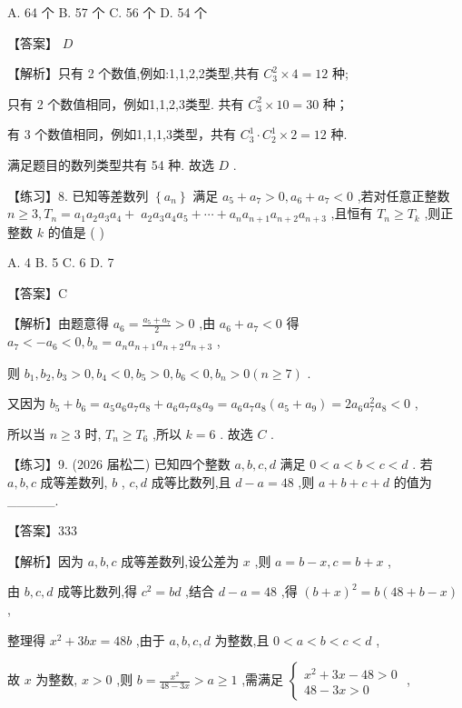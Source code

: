 \documentclass[10pt]{article}
\begin{document}
A. 64 个 B. 57 个 C. 56 个 D. 54 个

【答案】 \(D\)

【解析】只有 2 个数值,例如:1,1,2,2类型,共有 \({C}_{3}^{2} \times  4 = {12}\) 种;

只有 2 个数值相同，例如1,1,2,3类型. 共有 \({C}_{3}^{2} \times  {10} = {30}\) 种；

有 3 个数值相同，例如1,1,1,3类型，共有 \({C}_{3}^{1} \cdot  {C}_{2}^{1} \times  2 = {12}\) 种.

满足题目的数列类型共有 54 种. 故选 \(D\) .

【练习】8. 已知等差数列 \(\left\{  {a}_{n}\right\}\) 满足 \({a}_{5} + {a}_{7} > 0,{a}_{6} + {a}_{7} < 0\) ,若对任意正整数 \(n \geq  3,{T}_{n} = {a}_{1}{a}_{2}{a}_{3}{a}_{4} + \; {a}_{2}{a}_{3}{a}_{4}{a}_{5} + \cdots  + {a}_{n}{a}_{n + 1}{a}_{n + 2}{a}_{n + 3}\) ,且恒有 \({T}_{n} \geq  {T}_{k}\) ,则正整数 \(k\) 的值是 ( )

A. 4 B. 5 C. 6 D. 7

【答案】C

【解析】由题意得 \({a}_{6} = \frac{{a}_{5} + {a}_{7}}{2} > 0\) ,由 \({a}_{6} + {a}_{7} < 0\) 得 \({a}_{7} <  - {a}_{6} < 0,{b}_{n} = {a}_{n}{a}_{n + 1}{a}_{n + 2}{a}_{n + 3}\) ,

则 \({b}_{1},{b}_{2},{b}_{3} > 0,{b}_{4} < 0,{b}_{5} > 0,{b}_{6} < 0,{b}_{n} > 0\left( {n \geq  7}\right)\) .

又因为 \({b}_{5} + {b}_{6} = {a}_{5}{a}_{6}{a}_{7}{a}_{8} + {a}_{6}{a}_{7}{a}_{8}{a}_{9} = {a}_{6}{a}_{7}{a}_{8}\left( {{a}_{5} + {a}_{9}}\right)  = 2{a}_{6}{a}_{7}^{2}{a}_{8} < 0\) ,

所以当 \(n \geq  3\) 时, \({T}_{n} \geq  {T}_{6}\) ,所以 \(k = 6\) . 故选 \(C\) .

【练习】9. (2026 届松二) 已知四个整数 \(a,b,c,d\) 满足 \(0 < a < b < c < d\) . 若 \(a,b,c\) 成等差数列, \(b\) , \(c,d\) 成等比数列,且 \(d - a = {48}\) ,则 \(a + b + c + d\) 的值为\_\_\_\_\_.

【答案】333

【解析】因为 \(a,b,c\) 成等差数列,设公差为 \(x\) ,则 \(a = b - x,c = b + x\) ,

由 \(b,c,d\) 成等比数列,得 \({c}^{2} = {bd}\) ,结合 \(d - a = {48}\) ,得 \({\left( b + x\right) }^{2} = b\left( {{48} + b - x}\right)\) ,

整理得 \({x}^{2} + {3bx} = {48b}\) ,由于 \(a,b,c,d\) 为整数,且 \(0 < a < b < c < d\) ,

故 \(x\) 为整数, \(x > 0\) ,则 \(b = \frac{{x}^{2}}{{48} - {3x}} > a \geq  1\) ,需满足 \(\left\{  \begin{array}{l} {x}^{2} + {3x} - {48} > 0 \\  {48} - {3x} > 0 \end{array}\right.\) ,
\end{document}

